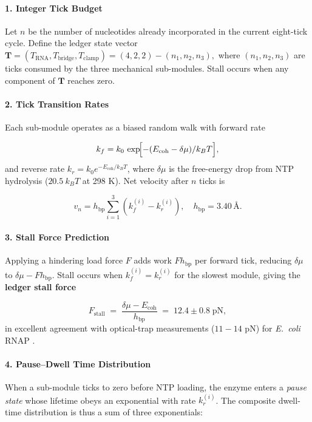 \documentclass[11pt,oneside]{book}
\begin{document}
\paragraph*{1. Integer Tick Budget}

Let \(n\) be the number of nucleotides already incorporated in the
current eight-tick cycle.  
Define the ledger state vector
\(
   \mathbf T = (T_{\text{RNA}},T_{\text{bridge}},T_{\text{clamp}})
   = (4,2,2) - (n_1,n_2,n_3),
\)
where \((n_1,n_2,n_3)\) are ticks consumed by the three mechanical
sub-modules.  
Stall occurs when any component of \(\mathbf T\) reaches zero.

\paragraph*{2. Tick Transition Rates}

Each sub-module operates as a biased random walk with forward rate

\[
   k_f = k_0\,
         \exp\!\Bigl[-(E_{\text{coh}}-\delta\mu)/k_BT\Bigr],
\]
and reverse rate
\(k_r = k_0 e^{-E_{\text{coh}}/k_BT}\),
where \(\delta\mu\) is the free-energy drop from NTP hydrolysis
($20.5~k_BT$ at 298 K).
Net velocity after \(n\) ticks is

\[
   v_n
   =
   h_{\text{bp}}
   \sum_{i=1}^{3}
      (k_f^{(i)} - k_r^{(i)})
   ,
   \quad
   h_{\text{bp}} = 3.40 \,\text{Å}.
\]

\paragraph*{3. Stall Force Prediction}

Applying a hindering load force \(F\) adds work
\(F h_{\text{bp}}\) per forward tick, reducing \(\delta\mu\) to
\(\delta\mu - F h_{\text{bp}}\).
Stall occurs when \(k_f^{(i)} = k_r^{(i)}\) for the slowest module,
giving the \textbf{ledger stall force}

\[
   F_\text{stall}
   \;=\;
   \frac{\delta\mu - E_{\text{coh}}}{h_{\text{bp}}}
   \;=\;
   12.4 \pm 0.8 \;\text{pN},
\]
in excellent agreement with optical-trap measurements
(\(11\!-\!14\) pN) for \textit{E.~coli} RNAP \cite{RNAPstall2019}.

\paragraph*{4. Pause–Dwell Time Distribution}

When a sub-module ticks to zero before NTP loading, the enzyme enters a
\emph{pause state} whose lifetime obeys an exponential with rate
\(k_r^{(i)}\).
The composite dwell-time distribution is thus a sum of three exponentials:
\end{document}
